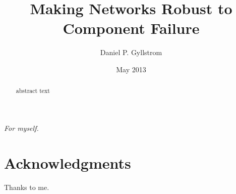 \documentclass{umthesis}
\begin{document}
%

\title{Making Networks Robust to Component Failure}
\author{Daniel P. Gyllstrom}
\date{May 2013} %


\frontmatter
\maketitle
\copyrightpage     %
\signaturepage

\begin{dedication}              %
  \begin{center}
    \emph{For myself.}
  \end{center}
\end{dedication}



\chapter{Acknowledgments}             %
  Thanks to me. 

\begin{abstract}                %
abstract text

\end{abstract}

%

\tableofcontents                %
\listoftables                   %
\listoffigures                  %


\mainmatter   %
\end{document}
